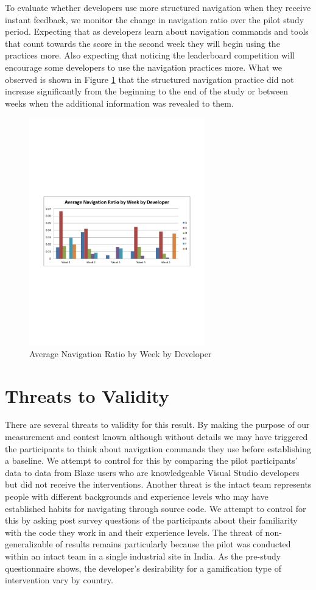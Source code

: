 \documentclass{sig-alternate}
\begin{document}
To evaluate whether developers use more structured navigation when they receive instant feedback, we monitor the change in navigation ratio over the pilot study period.   Expecting that as developers learn about navigation commands and tools that count towards the score in the second week they will begin using the practices more.  Also expecting that noticing the leaderboard competition will encourage some developers to use the navigation practices more.  What we observed is shown in Figure \ref{fig:navigationaverage} that the structured navigation practice did not increase significantly from the beginning to the end of the study or between weeks when the additional information was revealed to them.  

\begin{figure}\begin{mdframed}[linecolor=white]
	\includegraphics[width=3in]{navigationaverage.pdf}
	\caption{Average Navigation Ratio by Week by Developer}
	\label{fig:navigationaverage}
\end{mdframed}\end{figure}


\section{Threats to Validity}
There are several threats to validity for this result.  By making the purpose of our measurement and contest known although without details we may have triggered the participants to think about navigation commands they use before establishing a baseline.  We attempt to control for this by comparing the pilot participants' data to data from Blaze users who are knowledgeable Visual Studio developers but did not receive the interventions.  Another threat is the intact team represents people with different backgrounds and experience levels who may have established habits for navigating through source code.  We attempt to control for this by asking post survey questions of the participants about their familiarity with the code they work in and their experience levels.  The threat of non- generalizable of results remains particularly because the pilot was conducted within an intact team in a single industrial site in India. As the pre-study questionnaire shows, the developer's desirability for a gamification type of intervention vary by country.
\end{document}
